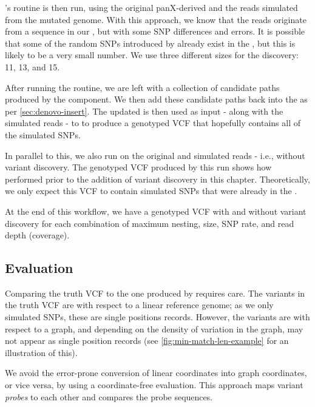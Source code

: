 \pandora{}'s  routine is then run, using the original panX-derived \panrg{} and the reads simulated from the mutated genome. With this approach, we know that the reads originate from a sequence in our \panrg{}, but with some SNP differences and \ont{} errors. It is possible that some of the random SNPs introduced by  already exist in the \panrg{}, but this is likely to be a very small number. We use three different \kmer{} sizes for the \denovo{} discovery: 11, 13, and 15. 

After running the  routine, we are left with a collection of candidate paths produced by the \denovo{} component. We then add these candidate paths back into the \panrg{} as per \autoref{sec:denovo-insert}. The updated \panrg{} is then used as input - along with the simulated reads - to \pandora{}  to produce a genotyped VCF that hopefully contains all of the simulated SNPs.

In parallel to this, we also run \pandora{}  on the original \panrg{} and simulated reads - i.e., without variant discovery. The genotyped VCF produced by this run shows how \pandora{} performed prior to the addition of \denovo{} variant discovery in this chapter. Theoretically, we only expect this VCF to contain simulated SNPs that were already in the \panrg{}.

At the end of this workflow, we have a genotyped VCF with and without \denovo{} variant discovery for each combination of maximum nesting, \denovo{} \kmer{} size, SNP rate, and read depth (coverage).

\subsection{Evaluation}
\label{sec:denovo-sims-eval}

Comparing the truth VCF to the one produced by \pandora{} requires care. The variants in the truth VCF are with respect to a linear reference genome; as we only simulated SNPs, these are single positions records. However, the \pandora{} variants are with respect to a graph, and depending on the density of variation in the graph, may not appear as single position records (see \autoref{fig:min-match-len-example} for an illustration of this). 

We avoid the error-prone conversion of linear coordinates into graph coordinates, or vice versa, by using a coordinate-free evaluation. This approach maps variant \emph{probes} to each other and compares the probe sequences.  


